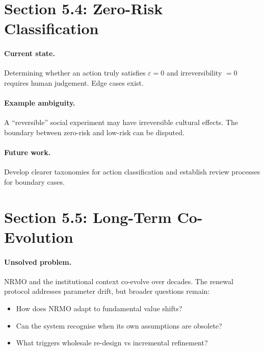 \section{Section 5.4: Zero-Risk Classification}
\label{sec:zero-risk-classification}

\paragraph{Current state.}
Determining whether an action truly satisfies $\varepsilon = 0$ and
irreversibility $= 0$ requires human judgement. Edge cases exist.

\paragraph{Example ambiguity.}
A ``reversible'' social experiment may have irreversible cultural
effects. The boundary between zero-risk and low-risk can be
disputed.

\paragraph{Future work.}
Develop clearer taxonomies for action classification and establish
review processes for boundary cases.

\section{Section 5.5: Long-Term Co-Evolution}
\label{sec:long-term-coevolution}

\paragraph{Unsolved problem.}
NRMO and the institutional context co-evolve over decades. The
renewal protocol addresses parameter drift, but broader questions
remain:

\begin{itemize}
\item How does NRMO adapt to fundamental value shifts?
\item Can the system recognise when its own assumptions are
obsolete?
\item What triggers wholesale re-design vs incremental refinement?
\end{itemize}

